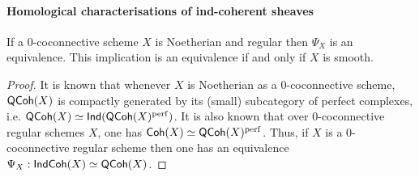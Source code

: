                 \paragraph{Homological characterisations of ind-coherent sheaves}
                    \begin{theorem} \label{theorem: indcoh_on_classically__regular_and_smooth_schemes}
                        If a $0$-coconnective scheme $X$ is Noetherian and regular then $\Psi_X$ is an equivalence. This implication is an equivalence if and only if $X$ is smooth.
                    \end{theorem}
                        \begin{proof}
                            It is known that whenever $X$ is Noetherian as a $0$-coconnective scheme, $\mathsf{QCoh}(X)$ is compactly generated by its (small) subcategory of perfect complexes, i.e. $\mathsf{QCoh}(X) \simeq \mathsf{Ind}(\mathsf{QCoh}(X)^{\mathrm{perf}})$. It is also known that over $0$-coconnective regular schemes $X$, one has $\mathsf{Coh}(X) \simeq \mathsf{QCoh}(X)^{\mathrm{perf}}$. Thus, if $X$ is a $0$-coconnective regular scheme then one has an equivalence $\Psi_X: \mathsf{Ind}\mathsf{Coh}(X) \simeq \mathsf{QCoh}(X)$.
                            
                        \end{proof}
                        
